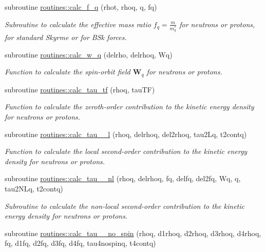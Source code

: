 \begin{DoxyCompactItemize}
subroutine \mbox{\hyperlink{namespaceroutines_a701f911aa939448c5bee0589d57369ca}{routines\+::calc\+\_\+f\+\_\+q}} (rhot, rhoq, q, fq)
\begin{DoxyCompactList}\small\item\em Subroutine to calculate the effective mass ratio $f_q=\frac{m}{m^*_q}$ for neutrons or protons, for standard Skyrme or for B\+Sk forces. \end{DoxyCompactList}\item 
subroutine \mbox{\hyperlink{namespaceroutines_a8c520afea1e9ca6698a0792fbac37e7a}{routines\+::calc\+\_\+w\+\_\+q}} (delrho, delrhoq, Wq)
\begin{DoxyCompactList}\small\item\em Function to calculate the spin-\/orbit field $\textbf{W}_q$ for neutrons or protons. \end{DoxyCompactList}\item 
subroutine \mbox{\hyperlink{namespaceroutines_a421a5d2cca448f46b0dfb9bcdeec1111}{routines\+::calc\+\_\+tau\+\_\+tf}} (rhoq, tau\+TF)
\begin{DoxyCompactList}\small\item\em Function to calculate the zeroth-\/order contribution to the kinetic energy density for neutrons or protons. \end{DoxyCompactList}\item 
subroutine \mbox{\hyperlink{namespaceroutines_aaa80f6938f2b9c661821fa8956f8deef}{routines\+::calc\+\_\+tau\+\_\+\_\+l}} (rhoq, delrhoq, del2rhoq, tau2\+Lq, t2contq)
\begin{DoxyCompactList}\small\item\em Function to calculate the local second-\/order contribution to the kinetic energy density for neutrons or protons. \end{DoxyCompactList}\item 
subroutine \mbox{\hyperlink{namespaceroutines_a72bf2988651a9f3251dfb338ad1a7eca}{routines\+::calc\+\_\+tau\+\_\+\_\+nl}} (rhoq, delrhoq, fq, delfq, del2fq, Wq, q, tau2\+N\+Lq, t2contq)
\begin{DoxyCompactList}\small\item\em Subroutine to calculate the non-\/local second-\/order contribution to the kinetic energy density for neutrons or protons. \end{DoxyCompactList}\item 
subroutine \mbox{\hyperlink{namespaceroutines_a9c7e02754e0ae8816b1bfeab92df6bc8}{routines\+::calc\+\_\+tau\+\_\+\_\+no\+\_\+spin}} (rhoq, d1rhoq, d2rhoq, d3rhoq, d4rhoq, fq, d1fq, d2fq, d3fq, d4fq, tau4nospinq, t4contq)

\end{DoxyCompactItemize}
